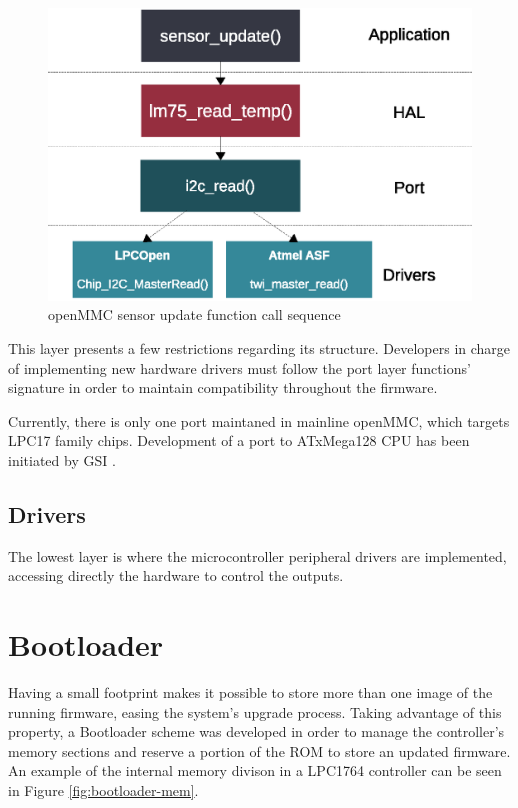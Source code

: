 \documentclass[a4paper,
              ]{jacow}
\begin{document}
\begin{figure}[!htb]
\centering
\includegraphics[scale=0.6]{port-example-dark.eps}
\caption{openMMC sensor update function call sequence}
\label{fig:port-example}
\end{figure}

This layer presents a few restrictions regarding its structure. Developers in charge of implementing new hardware drivers must follow the port layer functions' signature in order to maintain compatibility throughout the firmware.

Currently, there is only one port maintaned in mainline openMMC, which targets LPC17 family chips.
Development of a port to ATxMega128 CPU has been initiated by GSI \cite{gsi-mmc}.

\subsection{Drivers}
The lowest layer is where the microcontroller peripheral drivers are implemented, accessing directly the hardware to control the outputs.

\section{Bootloader}
Having a small footprint makes it possible to store more than one image of the running firmware, easing the system's upgrade process. Taking advantage of this property, a Bootloader scheme was developed in order to manage the controller's memory sections and reserve a portion of the ROM to store an updated firmware. An example of the internal memory divison in a LPC1764 controller can be seen in Figure \ref{fig:bootloader-mem}.
\end{document}
